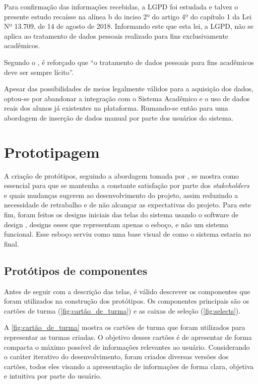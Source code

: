 Para confirmação das informações recebidas, a LGPD foi estudada e talvez o presente estudo recaísse na alínea b do inciso 2º do artigo 4º do capítulo 1 da Lei Nº 13.709, de 14 de agosto de 2018. Informando este que esta lei, a LGPD, não se aplica ao tratamento de dados pessoais realizado para fins exclusivamente acadêmicos.

Segundo o , é reforçado que ``o tratamento de dados pessoais para fins acadêmicos deve ser sempre lícito''.

Apesar das possibilidades de meios legalmente válidos para a aquisição dos dados, optou-se por abandonar a integração com o Sistema Acadêmico e o uso de dados reais dos alunos já existentes na plataforma. Rumando-se então para uma abordagem de inserção de dados manual por parte dos usuários do sistema.

\section{Prototipagem} \label{sec:prototipagem} %

A criação de protótipos, seguindo a abordagem tomada por , se mostra como essencial para que se mantenha a constante satisfação por parte dos \textit{stakeholders} e quais mudanças sugerem ao desenvolvimento do projeto, assim reduzindo a necessidade de retrabalho e de não alcançar as expectativas do projeto. Para este fim, foram feitos os designs iniciais das telas do sistema usando o software de design , designs esses que representam apenas o esboço, e não um sistema funcional. Esse esboço serviu como uma base visual de como o sistema estaria no final.

\subsection{Protótipos de componentes} \label{subsec:componentes} %

Antes de seguir com a descrição das telas, é válido descrever os componentes que foram utilizados na construção dos protótipos. Os componentes principais são os cartões de turma (\autoref{fig:cartão_de_turma}) e as caixas de seleção (\autoref{fig:selects}).

A \autoref{fig:cartão_de_turma} mostra os cartões de turma que foram utilizados para representar as turmas criadas. O objetivo desses cartões é de apresentar de forma compacta o máximo possível de informações relevantes ao usuário. Considerando o caráter iterativo do desenvolvimento, foram criados diversas versões dos cartões, todos eles visando a apresentação de informações de forma clara, objetiva e intuitiva por parte do usuário.

